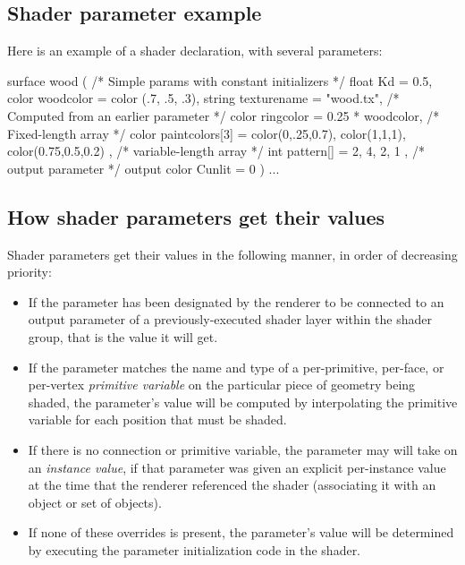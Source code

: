 \documentclass[11pt,letterpaper]{book}
\begin{document}
\subsection{Shader parameter example}

Here is an example of a shader declaration, with several parameters:

\begin{code}
    surface wood ( 
               /* Simple params with constant initializers */
                   float Kd = 0.5,
                   color woodcolor = color (.7, .5, .3),
                   string texturename = "wood.tx",
               /* Computed from an earlier parameter */
                   color ringcolor = 0.25 * woodcolor,
               /* Fixed-length array */
                   color paintcolors[3] = { color(0,.25,0.7), color(1,1,1),
                                            color(0.75,0.5,0.2) },
               /* variable-length array */
                   int pattern[] = { 2, 4, 2, 1 },
               /* output parameter */
                   output color Cunlit = 0
                 )
    {
       ...
    }
\end{code}

\subsection{How shader parameters get their values}

Shader parameters get their values in the following manner,
in order of decreasing priority:

\begin{itemize}
\item If the parameter has been designated by the renderer to be
  connected to an output parameter of a previously-executed shader layer
  within the shader group, that is the value it will get.
\item If the parameter matches the name and type of a per-primitive,
  per-face, or per-vertex \emph{primitive variable} on the particular
  piece of geometry being shaded, the parameter's value will be computed
  by interpolating the primitive variable for each position that must be
  shaded.
\item If there is no connection or primitive variable, the parameter may
  will take on an \emph{instance value}, if that parameter was given an
  explicit per-instance value at the time that the renderer referenced
  the shader (associating it with an object or set of objects).
\item If none of these overrides is present, the parameter's value will
  be determined by executing the parameter initialization code in the
  shader.
\end{itemize}
\end{document}

